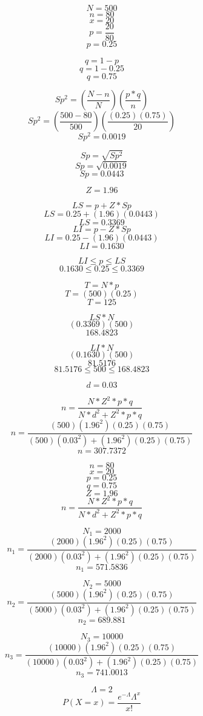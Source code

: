 $$N = 500$$
$$n = 80$$
$$x = 20$$
$$p = \frac{20}{80}$$
$$p = 0.25$$

$$q = 1 - p$$
$$q = 1 - 0.25$$
$$q = 0.75$$

$$Sp^{2} = (\frac{N - n}{N})(\frac{p*q}{n})$$
$$Sp^{2} = (\frac{500 - 80}{500})(\frac{(0.25)(0.75)}{20})$$
$$Sp^{2} = 0.0019$$

$$Sp = \sqrt{Sp^{2}}$$
$$Sp = \sqrt{0.0019}$$
$$Sp = 0.0443$$

$$Z = 1.96$$

$$LS = p + Z*Sp$$
$$LS = 0.25 + (1.96)(0.0443)$$
$$LS = 0.3369$$
$$LI = p - Z*Sp$$
$$LI = 0.25 - (1.96)(0.0443)$$
$$LI = 0.1630$$

$$LI \leqslant p \leqslant LS$$
$$0.1630 \leqslant 0.25 \leqslant 0.3369$$

$$T = N*p$$
$$T = (500)(0.25)$$
$$T = 125$$

$$LS*N$$
$$(0.3369)(500)$$
$$168.4823$$

$$LI*N$$
$$(0.1630)(500)$$
$$81.5176$$
$$81.5176 \leqslant 500 \leqslant 168.4823$$


$$d = 0.03$$

$$n = \frac{N*Z^{2}*p*q}{N*d^{2}+Z^{2}*p*q}$$
$$n = \frac{(500)(1.96^{2})(0.25)(0.75)}{(500)(0.03^{2})+(1.96^{2})(0.25)(0.75)}$$
$$n = 307.7372$$

$$n = 80$$
$$x = 20$$
$$p = 0.25$$
$$q = 0.75$$
$$Z = 1.96$$
$$n = \frac{N*Z^{2}*p*q}{N*d^{2}+Z^{2}*p*q}$$

$$N_{1} = 2000$$
$$n_{1} = \frac{(2000)(1.96^{2})(0.25)(0.75)}{(2000)(0.03^{2})+(1.96^{2})(0.25)(0.75)}$$
$$n_{1} = 571.5836$$

$$N_{2} = 5000$$
$$n_{2} = \frac{(5000)(1.96^{2})(0.25)(0.75)}{(5000)(0.03^{2})+(1.96^{2})(0.25)(0.75)}$$
$$n_{2} = 689.881$$

$$N_{3} = 10000$$
$$n_{3} = \frac{(10000)(1.96^{2})(0.25)(0.75)}{(10000)(0.03^{2})+(1.96^{2})(0.25)(0.75)}$$
$$n_{3} = 741.0013$$

$$\Lambda=2$$
$$P(X=x)=\frac{e^{-\Lambda}\Lambda^{x}}{x!}$$

